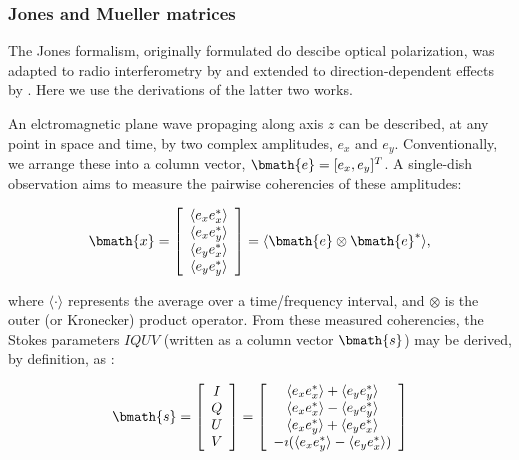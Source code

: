 \documentclass[fleqn,usenatbib]{mnras}
\begin{document}
%
\subsubsection{Jones and Mueller matrices}  		\label{sec:mueller}
The Jones \citep{1948JOSA...38..671J, 1942JOSA...32..486J} formalism, originally formulated do descibe optical polarization, was adapted to radio interferometry
by  \cite{1996A&AS..117..137H} and extended to direction-dependent effects by \cite{2011A&A...527A.106S}. Here we use the derivations of the latter two works.

An elctromagnetic plane wave propaging along axis $z$ can be described, at any point in space and time, by two complex amplitudes, $e_x$ and $e_y$. Conventionally,
we arrange these into a column vector, $\bmath{e} = [e_x,e_y]^T$. A single-dish observation aims to measure the pairwise coherencies of these amplitudes:

\begin{equation}  \label{eq:pairwise}
\bmath{x} = \left [ \begin{array}{c} \langle e_x e_x^* \rangle \\ \langle e_x e_y^* \rangle \\ \langle e_y e_x^* \rangle \\ \langle e_y e_y^* \rangle \end{array} \right ] = 
\langle \bmath{e} \otimes \bmath{e}^* \rangle,
\end{equation} 

\noindent where $\langle\cdot\rangle$ represents the average over a time/frequency interval, and $\otimes$ is the outer (or Kronecker) product operator. From these
measured coherencies, the Stokes parameters $IQUV$ (written as a column vector $\bmath{s}$) may be derived, by definition, as \citep{1980poet.book.....B}:

\begin{equation}  \label{eq:stokes}
\bmath{s} = \left [ \begin{array}{c} I \\ Q\\ U \\ V \end{array} \right ] = 
\left [ \begin{array}{c} \langle e_x e_x^* \rangle + \langle e_y e_y^* \rangle \\ \langle e_x e_x^* \rangle - \langle e_y e_y^* \rangle \\ 
\langle e_x e_y^* \rangle + \langle e_y e_x^* \rangle \\ -\imath (\langle e_x e_y^* \rangle - \langle e_y e_x^* \rangle ) \end{array} \right ]
\end{equation} 
\end{document}
